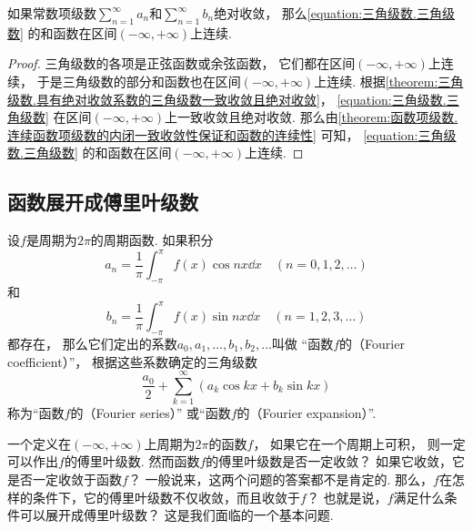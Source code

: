\begin{property}
如果常数项级数\(\sum_{n=1}^\infty a_n\)和\(\sum_{n=1}^\infty b_n\)绝对收敛，
那么\cref{equation:三角级数.三角级数} 的和函数在区间\((-\infty,+\infty)\)上连续.
\begin{proof}
三角级数的各项是正弦函数或余弦函数，
它们都在区间\((-\infty,+\infty)\)上连续，
于是三角级数的部分和函数也在区间\((-\infty,+\infty)\)上连续.
根据\cref{theorem:三角级数.具有绝对收敛系数的三角级数一致收敛且绝对收敛}，
\cref{equation:三角级数.三角级数} 在区间\((-\infty,+\infty)\)上一致收敛且绝对收敛.
那么由\cref{theorem:函数项级数.连续函数项级数的内闭一致收敛性保证和函数的连续性} 可知，
\cref{equation:三角级数.三角级数} 的和函数在区间\((-\infty,+\infty)\)上连续.
\end{proof}
\end{property}

\subsection{函数展开成傅里叶级数}
\begin{definition}\label{definition:无穷级数.傅里叶级数}
设\(f\)是周期为\(2 \pi\)的周期函数.
如果积分\begin{equation*}
	a_n = \frac{1}{\pi} \int_{-\pi}^\pi f(x) \cos nx \dd{x} \quad(n=0,1,2,\dotsc)
\end{equation*}和\begin{equation*}
	b_n = \frac{1}{\pi} \int_{-\pi}^\pi f(x) \sin nx \dd{x} \quad(n=1,2,3,\dotsc)
\end{equation*}都存在，
那么它们定出的系数\(a_0,a_1,\dotsc,b_1,b_2,\dotsc\)叫做%
“函数\(f\)的（Fourier coefficient）”，
根据这些系数确定的三角级数\begin{equation*}
	\frac{a_0}{2} + \sum_{k=1}^\infty (a_k \cos{kx} + b_k \sin kx)
\end{equation*}称为“函数\(f\)的（Fourier series）”
或“函数\(f\)的（Fourier expansion）”.
\end{definition}

一个定义在\((-\infty,+\infty)\)上周期为\(2\pi\)的函数\(f\)，
如果它在一个周期上可积，
则一定可以作出\(f\)的傅里叶级数.
然而函数\(f\)的傅里叶级数是否一定收敛？
如果它收敛，它是否一定收敛于函数\(f\)？
一般说来，这两个问题的答案都不是肯定的.
那么，\(f\)在怎样的条件下，它的傅里叶级数不仅收敛，而且收敛于\(f\)？
也就是说，\(f\)满足什么条件可以展开成傅里叶级数？
这是我们面临的一个基本问题.

